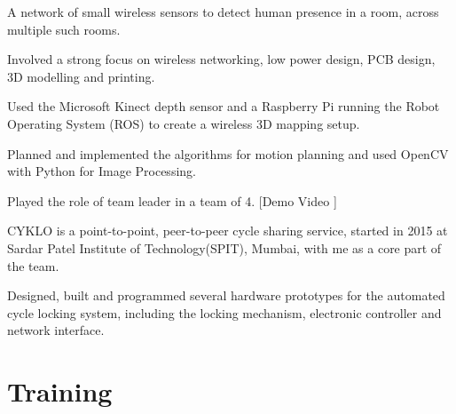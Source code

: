 \documentclass[]{deedy-resume-openfont}
\begin{document}
\begin{tightemize}
	\item A network of small wireless sensors to detect human presence in a room, across multiple such rooms.
	\item Involved a strong focus on wireless networking, low power design, PCB design, 3D modelling and printing.
\end{tightemize}
\sectionsep

\begin{tightemize}
	\item Used the Microsoft Kinect depth sensor and a Raspberry Pi running the Robot Operating System (ROS) to create a wireless 3D mapping setup.  
\end{tightemize}
\sectionsep

\descript{\phantom{.}}
\begin{tightemize}
	\item Planned and implemented the algorithms for motion planning and used OpenCV with Python for Image Processing.
	\item Played the role of team leader in a team of 4. [Demo Video \href{https://youtu.be/5FSh1lrSGKg}{ \faYoutubePlay}]
\end{tightemize}
\sectionsep

\begin{tightemize}
	\item CYKLO is a point-to-point, peer-to-peer cycle sharing service, started in 2015 at Sardar Patel Institute of Technology(SPIT), Mumbai, with me as a core part of the team.
	\item Designed, built and programmed several hardware prototypes for the automated cycle locking system, including the locking mechanism, electronic controller and network interface.
\end{tightemize}
\sectionsep


\section{Training}
\end{document}
